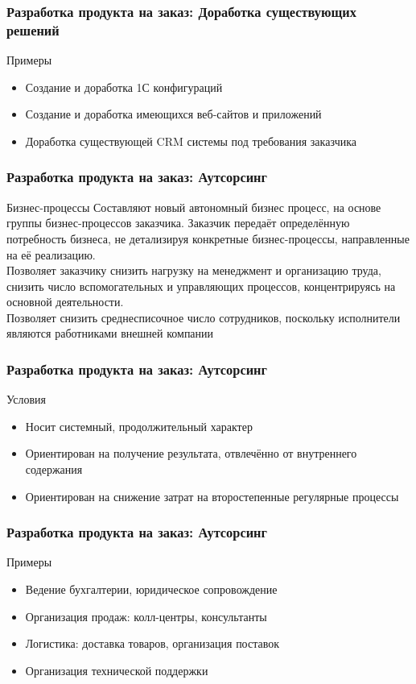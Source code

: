 \documentclass{../industrial-development}
\begin{document}
\begin{frame} \frametitle{Разработка продукта на заказ: Доработка существующих решений}
	\begin{block}{Примеры}
		\begin{itemize}
			\item Создание и доработка 1С конфигураций
			\item Создание и доработка имеющихся веб-сайтов и приложений
			\item Доработка существующей CRM системы под требования заказчика
		\end{itemize}
	\end{block}
\end{frame}
\lecturenotes


\begin{frame} \frametitle{Разработка продукта на заказ: Аутсорсинг}
	\begin{block}{Бизнес-процессы}
		Составляют новый автономный бизнес процесс, на основе группы бизнес-процессов заказчика. Заказчик передаёт определённую потребность бизнеса, не детализируя конкретные бизнес-процессы, направленные на её реализацию.\\
		Позволяет заказчику снизить нагрузку на менеджмент и организацию труда, снизить число вспомогательных и управляющих процессов, концентрируясь на основной деятельности.\\
		Позволяет снизить среднесписочное число сотрудников, поскольку исполнители являются работниками внешней компании
	\end{block}
\end{frame}
\lecturenotes


\begin{frame} \frametitle{Разработка продукта на заказ: Аутсорсинг}
	\begin{block}{Условия}
		\begin{itemize}
			\item Носит системный, продолжительный характер
			\item Ориентирован на получение результата, отвлечённо от внутреннего содержания
			\item Ориентирован на снижение затрат на второстепенные регулярные процессы
		\end{itemize}
	\end{block}
\end{frame}
\lecturenotes


\begin{frame} \frametitle{Разработка продукта на заказ: Аутсорсинг}
	\begin{block}{Примеры}
		\begin{itemize}
			\item Ведение бухгалтерии, юридическое сопровождение
			\item Организация продаж: колл-центры, консультанты
			\item Логистика: доставка товаров, организация поставок
			\item Организация технической поддержки
		\end{itemize}
	\end{block}
\end{frame}
\lecturenotes
\end{document}
